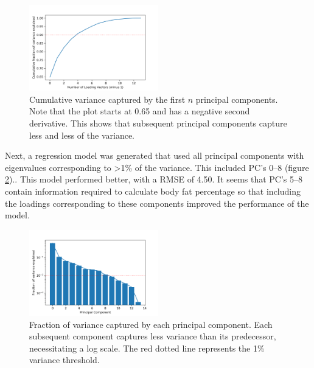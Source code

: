 \documentclass{IEEEtran}
\begin{document}
\begin{centering}
\begin{figure}
\centering
\begin{center}
	\includegraphics[width=0.5\textwidth]{cumulative_variance}
	\caption{Cumulative variance captured by the first $n$ principal components. Note that the plot starts at 0.65 and has a negative second derivative. This shows that subsequent principal components capture less and less of the variance.\label{fig:cumulative_variance}}
\end{center}
\end{figure}
\end{centering}

Next, a regression model was generated that used all principal components with eigenvalues corresponding to \textgreater1\% of the variance. This included PC's \numrange{0}{8} (figure \ref{fig:scaled_eigen}).. This model performed better, with a RMSE of \num{4.50}. It seems that PC's \numrange{5}{8} contain information required to calculate body fat percentage so that including the loadings corresponding to these components improved the performance of the model.

\begin{centering}
\begin{figure}
\centering
\begin{center}
	\includegraphics[width=0.5\textwidth]{fractional_variance_explained}
	\caption{Fraction of variance captured by each principal component. Each subsequent component captures less variance than its predecessor, necessitating a log scale. The red dotted line represents the 1\% variance threshold.\label{fig:scaled_eigen}}
\end{center}
\end{figure}
\end{centering}
\end{document}
